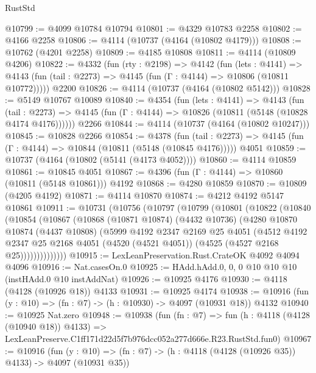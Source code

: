 \begin{lexlean}{RustStd}
\begin{coremodule}
@10799 := @4099 @10784 @10794
@10801 := @4329 @10783 @2258
@10802 := @4166 @2258
@10806 := @4114 (@10737 (@4164 (@10802 @4179)))
@10808 := @10762 (@4201 @2258)
@10809 := @4185 @10808
@10811 := @4114 (@10809 @4206)
@10822 := @4332
    (fun (rty : @2198) =>
    @4142
      (fun (lets : @4141) =>
      @4143 (fun (tail : @2273) => @4145 (fun (Γ : @4144) => @10806 (@10811 @10772)))))
    @2200
@10826 := @4114 (@10737 (@4164 (@10802 @5142)))
@10828 := @5149 @10767 @10089
@10840 := @4354
    (fun (lets : @4141) =>
    @4143
      (fun (tail : @2273) =>
      @4145 (fun (Γ : @4144) => @10826 (@10811 (@5148 (@10828 @4174 @4176))))))
    @2266
@10844 := @4114 (@10737 (@4164 (@10802 @10247)))
@10845 := @10828 @2266
@10854 := @4378
    (fun (tail : @2273) => @4145 (fun (Γ : @4144) => @10844 (@10811 (@5148 (@10845 @4176)))))
    @4051
@10859 := @10737 (@4164 (@10802 (@5141 (@4173 @4052))))
@10860 := @4114 @10859
@10861 := @10845 @4051
@10867 := @4396 (fun (Γ : @4144) => @10860 (@10811 (@5148 @10861))) @4192
@10868 := @4280 @10859
@10870 := @10809 (@4205 @4192)
@10871 := @4114 @10870
@10874 := @4212 @4192 @5147 @10861
@10911 := @10731
    (@10756
      (@10797
        (@10799
          (@10801
            (@10822
              (@10840
                (@10854
                  (@10867
                    (@10868
                      (@10871 @10874)
                      (@4432 @10736)
                      (@4280
                        @10870
                        @10874
                        (@4437 @10808)
                        (@5999
                          @4192
                          @2347
                          @2169
                          @25
                          @4051
                          (@4512
                            @4192
                            @2347
                            @25
                            @2168
                            @4051
                            (@4520 (@4521 @4051))
                            (@4525 (@4527 @2168 @25))))))))))))))
@10915 := LexLeanPreservation.Rust.CrateOK @4092 @4094 @4096
@10916 := Nat.casesOn.{0}
@10925 := HAdd.hAdd.{0, 0, 0} @10 @10 @10 (instHAdd.{0} @10 instAddNat)
@10926 := @10925 @4176
@10930 := @4118 (@4128 (@10926 @18)) @4133
@10931 := @10925 @4174
@10938 := @10916 (fun (y : @10) => (fn : @7) -> (h : @10930) -> @4097 (@10931 @18)) @4132
@10940 := @10925 Nat.zero
@10948 := @10938
    (fun (fn : @7) =>
    fun (h : @4118 (@4128 (@10940 @18)) @4133) =>
    LexLeanPreserve.C1ff171d22d5f7b976dcc052a277d666e.R23.RustStd.fun0)
@10967 := @10916
    (fun (y : @10) => (fn : @7) -> (h : @4118 (@4128 (@10926 @35)) @4133) -> @4097 (@10931 @35))

\end{coremodule}
\end{lexlean}
